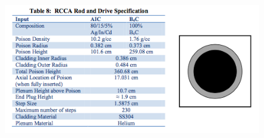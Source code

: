 \documentclass[12pt]{article}
\begin{document}
\begin{figure}[htb!]
    \centering
    \qquad
\end{figure}

\newpage
\thispagestyle{empty}

\begin{figure} [htb!]
\centering
\includegraphics[scale=0.7]{Figures/Control Rod Geometries.png}
\end{figure}
\end{document}
